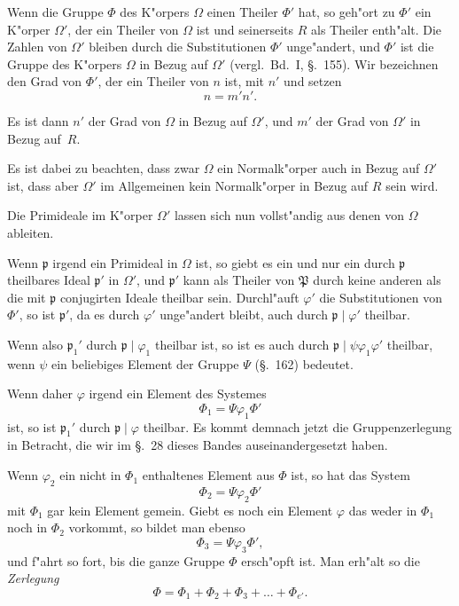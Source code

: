 \documentclass[12pt,a4paper]{article}
\theoremstyle{weber}
\begin{document}
\newpage
Wenn die Gruppe $\varPhi$ des K"orpers $\varOmega$ einen Theiler $\varPhi'$ hat,
so geh"ort zu $\varPhi'$ ein K"orper $\varOmega'$, der ein Theiler von $\varOmega$ ist und
seinerseits $R$ als Theiler enth"alt. Die Zahlen von $\varOmega'$ bleiben
durch die Substitutionen $\varPhi'$ unge"andert, und $\varPhi'$ ist die Gruppe des
K"orpers $\varOmega$ in Bezug auf $\varOmega'$ (vergl.\ Bd.~I, \S.~155). Wir bezeichnen
den Grad von $\varPhi'$, der ein Theiler von $n$ ist, mit $n'$ und setzen
\begin{equation}\label{eq:s163-1}
n = m'n'.
\end{equation}

Es ist dann $n'$ der Grad von $\varOmega$ in Bezug auf $\varOmega'$, und $m'$
der Grad von $\varOmega'$ in Bezug auf~$R$.

Es ist dabei zu beachten, dass zwar $\varOmega$ ein Normalk"orper
auch in Bezug auf $\varOmega'$ ist, dass aber $\varOmega'$ im Allgemeinen kein
Normalk"orper in Bezug auf $R$ sein wird.

Die Primideale im K"orper $\varOmega'$ lassen sich nun vollst"andig aus
denen von $\varOmega$ ableiten.

Wenn $\mathfrak{p}$ irgend ein Primideal in $\varOmega$ ist, so giebt es ein und
nur ein durch $\mathfrak{p}$ theilbares Ideal $\mathfrak{p}'$ in $\varOmega'$, und $\mathfrak{p}'$ kann als
Theiler von $\mathfrak{P}$ durch keine anderen als die mit $\mathfrak{p}$ conjugirten Ideale
theilbar sein. Durchl"auft $\varphi'$ die Substitutionen von $\varPhi'$, so ist $\mathfrak{p}'$,
da es durch $\varphi'$ unge"andert bleibt, auch durch $\mathfrak{p} \mid \varphi'$ theilbar.

Wenn also $\mathfrak{p}_1'$ durch $\mathfrak{p} \mid \varphi_1$ theilbar ist, so ist es auch durch
$\mathfrak{p} \mid \psi\varphi_1\varphi'$ theilbar, wenn $\psi$ ein beliebiges Element der Gruppe $\varPsi$
(\S.~162) bedeutet.

Wenn daher $\varphi$ irgend ein Element des Systemes
\[
\varPhi_1 = \varPsi\varphi_1\varPhi'
\]
ist, so ist $\mathfrak{p}_1'$ durch $\mathfrak{p} \mid \varphi$ theilbar. Es kommt demnach jetzt die
Gruppenzerlegung in Betracht, die wir im \S.~28 dieses Bandes
auseinandergesetzt haben.

Wenn $\varphi_2$ ein nicht in $\varPhi_1$ enthaltenes Element aus $\varPhi$ ist, so
hat das System
\[
\varPhi_2 = \varPsi\varphi_2\varPhi'
\]
mit $\varPhi_1$ gar kein Element gemein. Giebt es noch ein Element $\varphi$
das weder in $\varPhi_1$ noch in $\varPhi_2$ vorkommt, so bildet man ebenso
\[
\varPhi_3 = \varPsi\varphi_3\varPhi',
\]
und f"ahrt so fort, bis die ganze Gruppe $\varPhi$ ersch"opft ist. Man
erh"alt so die \emph{Zerlegung}
\begin{equation}\label{eq:s163-2}
\varPhi = \varPhi_1 + \varPhi_2 + \varPhi_3 + \dots + \varPhi_{e'}.
\end{equation}
\end{document}

